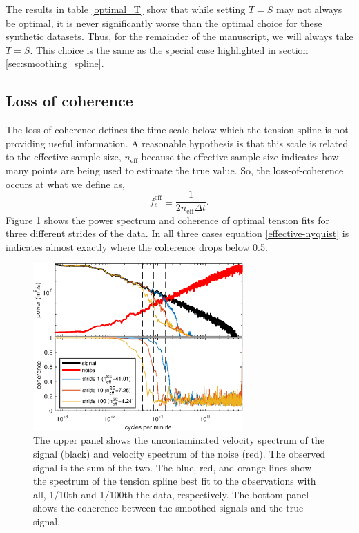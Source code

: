\documentclass[10pt,journal]{IEEEtran}
\begin{document}
The results in table \ref{optimal_T} show that while setting $T=S$ may not always be optimal, it is never significantly worse than the optimal choice for these synthetic datasets. Thus, for the remainder of the manuscript, we will always take $T=S$. This choice is the same as the special case highlighted in section \ref{sec:smoothing_spline}.

\subsection{Loss of coherence} \label{loss_of_coherence}

The loss-of-coherence defines the time scale below which the tension spline is not providing useful information. A reasonable hypothesis is that this scale is related to the effective sample size, $n_{\textrm{eff}}$ because the effective sample size indicates how many points are being used to estimate the true value. So, the loss-of-coherence occurs at what we define as,
\begin{equation}
\label{effective-nyquist}
    f_s^{\textrm{eff}} \equiv \frac{1}{2 n_{\textrm{eff}} \Delta t}.
\end{equation}
Figure \ref{synthetic_process_and_spectrum} shows the power spectrum and coherence of optimal tension fits for three different strides of the data. In all three cases equation \ref{effective-nyquist} is indicates almost exactly where the coherence drops below 0.5.

\begin{figure}
  \centerline{\includegraphics[width=19pc,angle=0]{figures/synthetic_process_and_spectrum_slope2degree3}}
  
  \caption{The upper panel shows the uncontaminated velocity spectrum of the signal (black) and velocity spectrum of the noise (red). The observed signal is the sum of the two. The blue, red, and orange lines show the spectrum of the tension spline best fit to the observations with all, 1/10th and 1/100th the data, respectively. The bottom panel shows the coherence between the smoothed signals and the true signal.}
  \label{synthetic_process_and_spectrum}
\end{figure}
\end{document}
